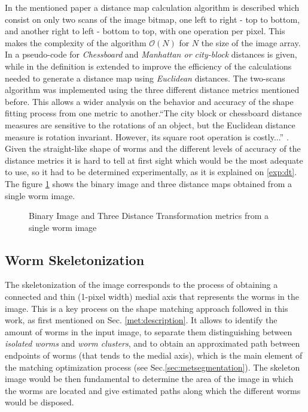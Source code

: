In the mentioned paper a distance map calculation algorithm is described which consist
on only two scans of the image bitmap, one left to right - top to bottom, and another
right to left - bottom to top, with one operation per pixel. This makes the complexity
of the algorithm $\mathcal{O}(N)$ for $N$ the size of the image array.
In \cite[p.197]{fastdt} a pseudo-code for \emph{Chessboard} and 
\emph{Manhattan or city-block} distances is given, while in \cite[p.198]{fastdt} the 
definition is extended to improve the efficiency of the calculations needed to 
generate a distance map using \emph{Euclidean} distances.
The two-scans algorithm was implemented using the three different distance metrics
mentioned before. This allows a wider analysis on the behavior and accuracy of the shape 
fitting process from one metric to another.``The city block or chessboard distance
measures are sensitive to the rotations of an object, but the Euclidean distance
measure is rotation invariant. However, its square root operation is costly...''
\cite[p.332]{eucskeleton}. Given the straight-like shape of worms and the different levels
of accuracy of the distance metrics it is hard to tell at first sight which would be 
the most adequate to use, so it had to be determined experimentally, as it is explained
on \ref{exp:dt}.
The figure \ref{fig:distance} shows the binary image and three distance maps obtained 
from a single worm image.

\begin{figure}[h t b p ! H]
  \centering
\qquad
\qquad                
\qquad
  \caption{Binary Image and Three Distance Transformation metrics from a single worm image}
  \label{fig:distance}
\end{figure}


\subsection{Worm Skeletonization}
\label{sec:metsk}

The skeletonization of the image corresponds to the process of obtaining a 
connected and thin (1-pixel width) medial axis that represents the worms in the 
image. This is a key process on the shape matching
approach followed in this work, as first mentioned on Sec. \ref{met:description}.
It allows to identify the amount of worms in the input image, to separate them 
distinguishing between \emph{isolated worms} and \emph{worm clusters}, and to
obtain an approximated path between endpoints 
of worms (that tends to the medial axis), which is the main element of the 
matching optimization process (see Sec.\ref{sec:metsegmentation}). The skeleton
image would be then fundamental to determine the area of the image in which
the worms are located and give estimated paths along which the different
worms would be disposed. \\

